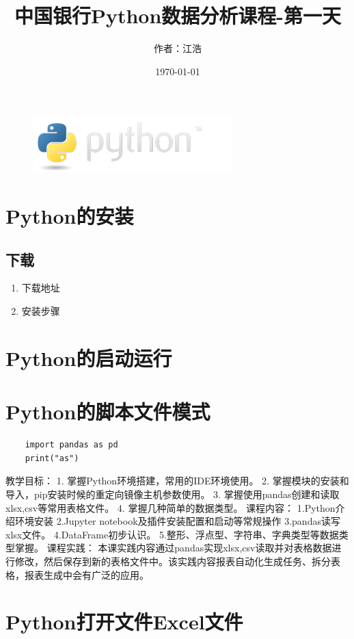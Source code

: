 \documentclass[UTF8]{ctexart}
\title{中国银行Python数据分析课程-第一天}
\author{作者：江浩}
\date{\today}
\begin{document}
\maketitle
\begin{figure}[ht]
	\centering
	\includegraphics[scale=1.0]{images/python-logo.png}
\end{figure}
\tableofcontents

\section{Python的安装}
	\subsection{下载}
	\begin{enumerate}
		\item 下载地址
		\item 安装步骤
	\end{enumerate}
\section{Python的启动运行}
\section{Python的脚本文件模式}
\begin{lstlisting}
	import pandas as pd 
	print("as")
\end{lstlisting}
教学目标：
1.	掌握Python环境搭建，常用的IDE环境使用。
2.	掌握模块的安装和导入，pip安装时候的重定向镜像主机参数使用。
3.	掌握使用pandas创建和读取xlsx,csv等常用表格文件。
4.	掌握几种简单的数据类型。
课程内容：
		1.Python介绍环境安装
		2.Jupyter notebook及插件安装配置和启动等常规操作
		3.pandas读写xlsx文件。
		4.DataFrame初步认识。
		5.整形、浮点型、字符串、字典类型等数据类型掌握。
课程实践：
		本课实践内容通过pandas实现xlsx,csv读取并对表格数据进行修改，然后保存到新的表格文件中。该实践内容报表自动化生成任务、拆分表格，报表生成中会有广泛的应用。


\section{Python打开文件Excel文件}
\end{document}
